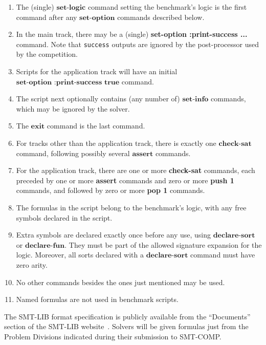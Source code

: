 \documentclass[12pt]{article}
\newcommand{\akey}[1]{\textbf{#1}}
\begin{document}
\begin{enumerate}
\item The (single) $\akey{set-logic}$ command setting the benchmark's
logic is the first command after any $\akey{set-option}$ commands described below.
\item In the main track, there may be a (single) \akey{set-option :print-success ...} command. Note that {\tt success} outputs are ignored by the post-processor used by the competition.
\item Scripts for the application track will have an initial $\akey{set-option :print-success true}$ command.
\item The script next optionally contains (any number of) $\akey{set-info}$ commands, which may be ignored by the solver.
\item The $\akey{exit}$ command is the last command.
\item For tracks other than the application track, there is exactly one $\akey{check-sat}$ command,
following possibly several $\akey{assert}$ commands.
\item For the application track, there are one or more \akey{check-sat} commands, 
  each preceded by one or more \akey{assert} commands 
  and zero or more \akey{push 1} commands, 
  and followed by zero or more \akey{pop 1} commands.

\item The formulas in the script belong to the benchmark's logic, with
any free symbols declared in the script.
\item Extra symbols are declared exactly once before any
  use, using $\akey{declare-sort}$
  or $\akey{declare-fun}$.
  They must be part of the allowed signature expansion for the logic.
  Moreover, all sorts declared with a $\akey{declare-sort}$ command must have zero arity.

\item No other commands besides the ones just mentioned may be used.
\item Named formulas are not used in benchmark scripts.

\end{enumerate}

  
\noindent The SMT-LIB format specification is publicly
available from the ``Documents'' section of the SMT-LIB
website~\cite{SMT-LIB}.  Solvers will be given formulas just from the
Problem Divisions indicated during their submission to SMT-COMP.
\end{document}
